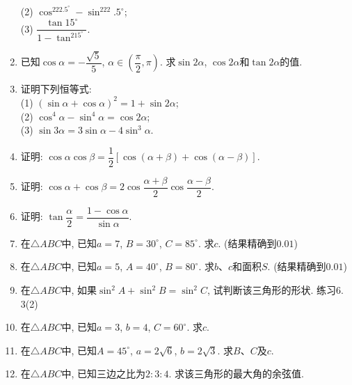 \documentclass[10pt,a4paper]{article}
\begin{document}
\begin{enumerate}[1.]
(2) $\cos^222.5^\circ -\sin^222. 5^\circ$;\\
(3) $\dfrac{\tan 15^\circ}{1-\tan^215^\circ}$.
\item 已知$\cos \alpha=-\dfrac{\sqrt 5}5$, $\alpha\in (\dfrac\pi 2, \pi)$. 求$\sin 2\alpha$, $\cos 2\alpha$和$\tan 2\alpha$的值.
\item 证明下列恒等式:\\
(1) $(\sin \alpha+\cos \alpha)^2=1+\sin 2\alpha$;\\
(2) $\cos^4\alpha-\sin^4\alpha=\cos 2\alpha$;\\
(3) $\sin 3\alpha=3\sin \alpha-4\sin^3\alpha$.
\item 证明: $\cos \alpha\cos \beta=\dfrac 12[\cos (\alpha+\beta)+\cos (\alpha-\beta)]$.
\item 证明: $\cos \alpha+\cos \beta=2\cos \dfrac{\alpha+\beta}
2 \cos \dfrac{\alpha-\beta}2$.
\item 证明: $\tan \dfrac\alpha2=\dfrac{1-\cos \alpha}{\sin \alpha}$.
\item 在$\triangle ABC$中, 已知$a=7$, $B=30^\circ$, $C=85^\circ$. 求$c$. (结果精确到$0. 01$)
\item 在$\triangle ABC$中, 已知$a=5$, $A=40^\circ$, $B=80^\circ$. 求$b$、$c$和面积$S$. (结果精确到$0. 01$)
\item 在$\triangle ABC$中, 如果$\sin^2A+\sin^2B=\sin^2C$, 试判断该三角形的形状. 
练习6. 3(2)
\item 在$\triangle ABC$中, 已知$a=3$, $b=4$, $C=60^\circ$. 求$c$.
\item 在$\triangle ABC$中, 已知$A=45^\circ$, $a=2\sqrt 6$, $b=2\sqrt 3$. 求$B$、$C$及$c$.
\item 在$\triangle ABC$中, 已知三边之比为$2:3:4$. 求该三角形的最大角的余弦值. 
\end{enumerate}
\end{document}
